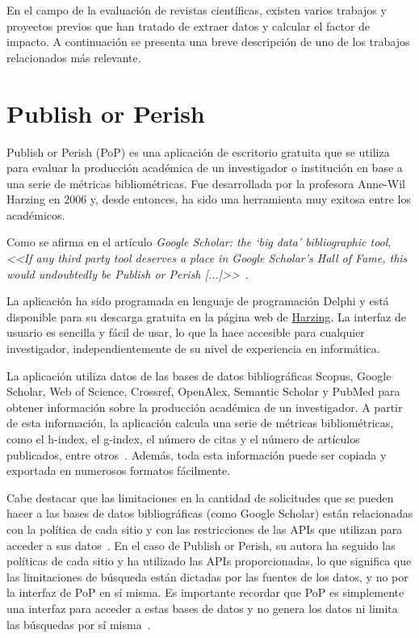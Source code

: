 
En el campo de la evaluación de revistas científicas, existen varios trabajos y proyectos previos que han tratado de extraer datos y calcular el factor de impacto. A continuación se presenta una breve descripción de uno de los trabajos relacionados más relevante.

\section{Publish or Perish}

Publish or Perish (PoP) es una aplicación de escritorio gratuita que se utiliza para evaluar la producción académica de un investigador o institución en base a una serie de métricas bibliométricas. Fue desarrollada por la profesora Anne-Wil Harzing en 2006 y, desde entonces, ha sido una herramienta muy exitosa entre los académicos.

Como se afirma en el artículo \textit{Google Scholar: the ‘big data’ bibliographic tool}, \textit{<<If any third party tool deserves a place in Google Scholar’s Hall of Fame, this would undoubtedly be Publish or Perish [...]>>}~\cite{lopez2017}.

La aplicación ha sido programada en lenguaje de programación Delphi y está disponible para su descarga gratuita en la página web de 
\href{https://harzing.com/resources/publish-or-perish/}{Harzing}. La interfaz de usuario es sencilla y fácil de usar, lo que la hace accesible para cualquier investigador, independientemente de su nivel de experiencia en informática.

La aplicación utiliza datos de las bases de datos bibliográficas Scopus, Google Scholar, Web of Science, Crossref, OpenAlex, Semantic Scholar y PubMed para obtener información sobre la producción académica de un investigador. A partir de esta información, la aplicación calcula una serie de métricas bibliométricas, como el h-index, el g-index, el número de citas y el número de artículos publicados, entre otros~\cite{harzing2010}. Además, toda esta información puede ser copiada y exportada en numerosos formatos fácilmente.


Cabe destacar que las limitaciones en la cantidad de solicitudes que se pueden hacer a las bases de datos bibliográficas (como Google Scholar) están relacionadas con la política de cada sitio y con las restricciones de las APIs que utilizan para acceder a sus datos~\cite{harzing2010}. En el caso de Publish or Perish, su autora ha seguido las políticas de cada sitio y ha utilizado las APIs proporcionadas, lo que significa que las limitaciones de búsqueda están dictadas por las fuentes de los datos, y no por la interfaz de PoP en sí misma. Es importante recordar que PoP es simplemente una interfaz para acceder a estas bases de datos y no genera los datos ni limita las búsquedas por sí misma~\cite{pop2007}.

